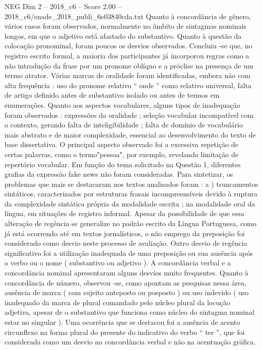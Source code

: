\begin{textsample}{NEG Dim 2 – 2018\_c6 – Score 2.00 – 2018\_c6/enade\_2018\_publi\_6e03840cda.txt}
Quanto à concordância de gênero, vários casos foram observados, normalmente no âmbito de sintagmas nominais longos, em que o adjetivo está afastado do substantivo.
Quanto à questão da colocação pronominal, foram poucos os desvios observados.
Concluiu -se que, no registro escrito formal, a maioria dos participantes já incorporou regras como a não introdução da frase por um pronome oblíquo e a próclise na presença de um termo atrator.
Várias marcas de oralidade foram identificadas, embora não com alta frequência : uso do pronome relativo “ onde ” como relativo universal, falta de artigo definido antes de substantivo isolado ou antes de termos em enumerações.
Quanto aos aspectos vocabulares, alguns tipos de inadequação foram observados : expressões da oralidade ; seleção vocabular incompatível com o contexto, gerando falta de inteligibilidade ; falta de domínio de vocabulário mais abstrato e de maior complexidade, essencial ao desenvolvimento do texto de base dissertativa.
O principal aspecto observado foi a excessiva repetição de certas palavras, como o termo"pessoa", por exemplo, revelando limitação de repertório vocabular.
Em função do tema solicitado na Questão 1, diferentes grafias da expressão fake news não foram consideradas.
Para sintetizar, os problemas que mais se destacaram nos textos analisados foram : a ) truncamentos sintáticos, caracterizados por estruturas frasais incompreensíveis devido à ruptura da complexidade sintática própria da modalidade escrita ; na modalidade oral da língua, em situações de registro informal.
Apesar da possibilidade de que essa alteração de regência se generalize no padrão escrito da Língua Portuguesa, como já está ocorrendo até em textos jornalísticos, o não emprego da preposição foi considerado como desvio neste processo de avaliação.
Outro desvio de regência significativo foi a utilização inadequada de uma preposição ou sua ausência após o verbo ou o nome ( substantivo ou adjetivo ).
A concordância verbal e a concordância nominal apresentaram alguns desvios muito frequentes.
Quanto à concordância de número, observou -se, como apontam as pesquisas nessa área, ausência de marca ( com sujeito anteposto ou posposto ) ou uso indevido ( uso inadequado da marca de plural comandado pelo núcleo plural da locução adjetiva, apesar de o substantivo que funciona como núcleo do sintagma nominal estar no singular ).
Uma ocorrência que se destacou foi a ausência de acento circunflexo na forma plural do presente do indicativo do verbo “ ter ”, que foi considerada como um desvio na concordância verbal e não na acentuação gráfica.

\end{textsample}
